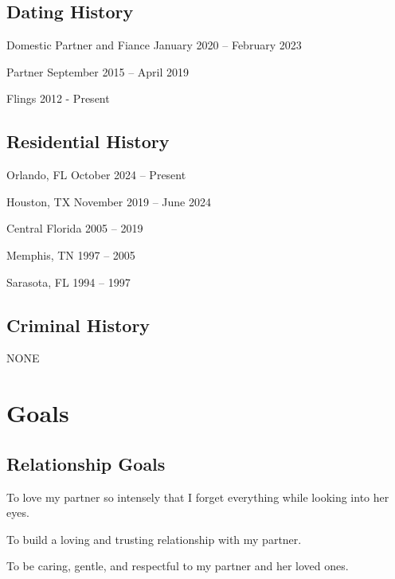 \documentclass[singlesided, paper=a4, fontsize=10.5pt]{bf-class}
\begin{document}
{    \subsection{Dating History}
    \begin{zitemize}
        \item Domestic Partner and Fiance \hfill January 2020 -- February 2023
        \item Partner \hfill September 2015 -- April 2019
        \item Flings \hfill 2012 - Present
    \end{zitemize}

    \subsection{Residential History}
    \begin{zitemize}
        \item Orlando, FL \hfill October 2024 -- Present
        \item Houston, TX \hfill November 2019 -- June 2024
        \item Central Florida \hfill 2005 -- 2019
        \item Memphis, TN \hfill 1997 -- 2005
        \item Sarasota, FL \hfill 1994 -- 1997
    \end{zitemize}

    \subsection{Criminal History}
    \begin{zitemize}
        \item NONE
    \end{zitemize}

    


    \section{Goals}

    \subsection{Relationship Goals}
    \begin{bitemize}
        \item To love my partner so intensely that I forget everything while looking into her eyes.
        \item To build a loving and trusting relationship with my partner.
        \item To be caring, gentle, and respectful to my partner and her loved ones.
    \end{bitemize}

}
\end{document}
